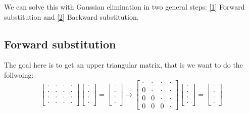\documentclass[english,notitlepage]{article}  %
\begin{document}
    We can solve this with Gaussian elimination in two general steps: \hyperref[sec:forward]{[1]} Forward substitution and \hyperref[sec:backward]{[2]} Backward substitution.

    \subsection*{Forward substitution}\label{sec:forward}

    The goal here is to get an upper triangular matrix, that is we want to do the follwoing:
    \begin{equation*}
        \begin{bmatrix}
            \cdot & \cdot & \cdot & \cdot \\
            \cdot & \cdot & \cdot & \cdot \\
            \cdot & \cdot & \cdot & \cdot \\
            \cdot & \cdot & \cdot & \cdot
        \end{bmatrix} \begin{bmatrix}
            \cdot\\
            \cdot\\
            \cdot\\
            \cdot
        \end{bmatrix} = \begin{bmatrix}
            \cdot\\
            \cdot\\
            \cdot\\
            \cdot
        \end{bmatrix}
        \rightarrow
        \begin{bmatrix}
            \cdot & \cdot & \cdot & \cdot \\
            0 & \cdot & \cdot & \cdot \\
            0 & 0 & \cdot & \cdot \\
            0 & 0 & 0 & \cdot
        \end{bmatrix} \begin{bmatrix}
            \cdot\\
            \cdot\\
            \cdot\\
            \cdot
        \end{bmatrix} = \begin{bmatrix}
            \cdot\\
            \cdot\\
            \cdot\\
            \cdot
        \end{bmatrix}
    \end{equation*}
\end{document}
